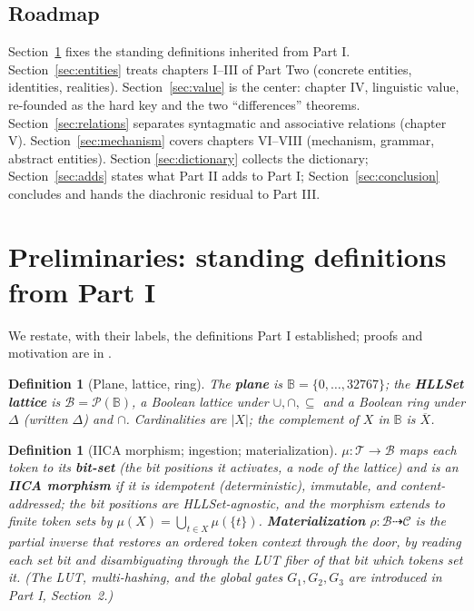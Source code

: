 \documentclass[11pt,a4paper]{article}
\newtheorem{definition}[principle]{Definition}
\theoremstyle{remark}
\newcommand{\Plane}{\ensuremath{\mathbb{B}}}            %
\newcommand{\Lat}{\ensuremath{\mathcal{B}}}              %
\newcommand{\Tok}{\ensuremath{\mathcal{T}}}              %
\newcommand{\xor}{\ensuremath{\Delta}}                   %
\newcommand{\Ctx}{\ensuremath{\mathcal{C}}}              %
\newcommand{\Ing}{\ensuremath{\mu}}                      %
\newcommand{\Mat}{\ensuremath{\rho}}                     %
\begin{document}
\subsection{Roadmap}

Section~\ref{sec:prelim} fixes the standing definitions inherited from Part I.
Section~\ref{sec:entities} treats chapters I--III of Part Two (concrete
entities, identities, realities). Section~\ref{sec:value} is the center:
chapter IV, linguistic value, re-founded as the hard key and the two
``differences'' theorems. Section~\ref{sec:relations} separates syntagmatic
and associative relations (chapter V). Section~\ref{sec:mechanism} covers
chapters VI--VIII (mechanism, grammar, abstract entities). Section
\ref{sec:dictionary} collects the dictionary; Section~\ref{sec:adds} states
what Part II adds to Part I; Section~\ref{sec:conclusion} concludes and hands
the diachronic residual to Part III.

\section{Preliminaries: standing definitions from Part I}
\label{sec:prelim}

We restate, with their labels, the definitions Part I established; proofs and
motivation are in \cite{part1}.

\begin{definition}[Plane, lattice, ring]
\label{def:plane}
The \textbf{plane} is $\Plane = \{0,\dots,32767\}$; the \textbf{HLLSet
lattice} is $\Lat = \mathcal{P}(\Plane)$, a Boolean lattice under
$\cup,\cap,\subseteq$ and a Boolean ring under $\xor$ (written $\Delta$) and
$\cap$. Cardinalities are $|X|$; the complement of $X$ in $\Plane$ is
$\overline{X}$.
\end{definition}

\begin{definition}[IICA morphism; ingestion; materialization]
\label{def:iica}
$\Ing : \Tok \to \Lat$ maps each token to its \textbf{bit-set} (the bit
positions it activates, a node of the lattice) and is an \textbf{IICA
morphism} if it is idempotent (deterministic), immutable, and
content-addressed; the bit positions are HLLSet-agnostic, and the morphism
extends to finite token sets by
$\Ing(X)=\bigcup_{t\in X}\Ing(\{t\})$. \textbf{Materialization}
$\Mat : \Lat \dashrightarrow \Ctx$ is the partial inverse that restores an
ordered token context through the door, by reading each set bit and
disambiguating through the LUT fiber of that bit which tokens set it.
(The LUT, multi-hashing, and the global gates $G_1,G_2,G_3$ are introduced
in Part I, Section~2.)
\end{definition}
\end{document}
